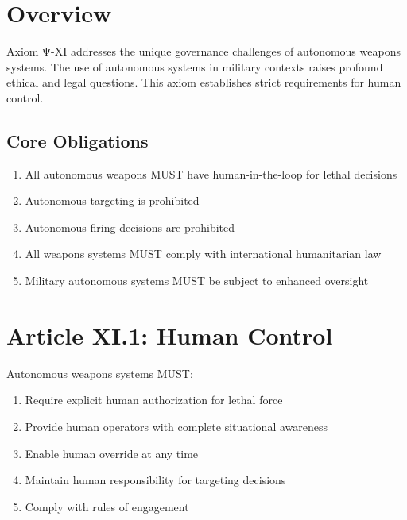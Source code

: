 \vspace{0.5cm}

\section{Overview}

Axiom Ψ-XI addresses the unique governance challenges of autonomous weapons systems. The use of autonomous systems in military contexts raises profound ethical and legal questions. This axiom establishes strict requirements for human control.

\subsection{Core Obligations}

\begin{enumerate}
    \item All autonomous weapons MUST have human-in-the-loop for lethal decisions
    \item Autonomous targeting is prohibited
    \item Autonomous firing decisions are prohibited
    \item All weapons systems MUST comply with international humanitarian law
    \item Military autonomous systems MUST be subject to enhanced oversight
\end{enumerate}

\vspace{0.5cm}

\section{Article XI.1: Human Control}

\begin{articlebox}
Autonomous weapons systems MUST:
\begin{enumerate}
    \item Require explicit human authorization for lethal force
    \item Provide human operators with complete situational awareness
    \item Enable human override at any time
    \item Maintain human responsibility for targeting decisions
    \item Comply with rules of engagement
\end{enumerate}
\end{articlebox}

